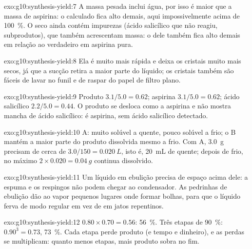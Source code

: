 \begin{solution}{exo:g10:synthesis-yield:7}
A massa pesada inclui água, por isso é maior que a massa de aspirina: o
 calculado fica alto demais, aqui impossivelmente acima de
\qty{100}{\percent}. O  seco ainda contém impurezas (ácido
salicílico que não reagiu, subprodutos), que também acrescentam massa:
o  dele também fica alto demais em relação ao 
verdadeiro em aspirina pura.
\end{solution}

\begin{solution}{exo:g10:synthesis-yield:8}
Ela é muito mais rápida e deixa os cristais muito mais secos, já que a
sucção retira a maior parte do líquido; os cristais também são fáceis de
lavar no funil e de raspar do papel de filtro plano.
\end{solution}

\begin{solution}{exo:g10:synthesis-yield:9}
Produto $3.1/5.0 = 0.62$; aspirina $3.1/5.0 = 0.62$; ácido salicílico
$2.2/5.0 = 0.44$. O produto se desloca como a aspirina e não mostra
mancha de ácido salicílico: é aspirina, sem ácido salicílico detectado.
\end{solution}

\begin{solution}{exo:g10:synthesis-yield:10}
 A: muito solúvel a quente, pouco solúvel a frio; o  B
mantém a maior parte do produto dissolvida mesmo a frio. Com A,
\qty{3.0}{g} precisam de cerca de $3.0 / 150 = \qty{0.020}{L}$, isto é,
\qty{20}{mL} de  quente; depois de frio, no máximo
$2 \times 0.020 = \qty{0.04}{g}$ continua dissolvido.
\end{solution}

\begin{solution}{exo:g10:synthesis-yield:11}
Um líquido em ebulição precisa de espaço acima dele: a espuma e os
respingos não podem chegar ao condensador. As pedrinhas de ebulição dão
ao vapor pequenos lugares onde formar bolhas, para que o líquido ferva
de modo regular em vez de em jatos repentinos.
\end{solution}

\begin{solution}{exo:g10:synthesis-yield:12}
$0.80 \times 0.70 = 0.56$: \qty{56}{\percent}. Três etapas de
\qty{90}{\percent}: $0.90^3 = 0.73$, \qty{73}{\percent}. Cada etapa perde
produto (e tempo e dinheiro), e as perdas se multiplicam: quanto menos
etapas, mais produto sobra no fim.
\end{solution}

